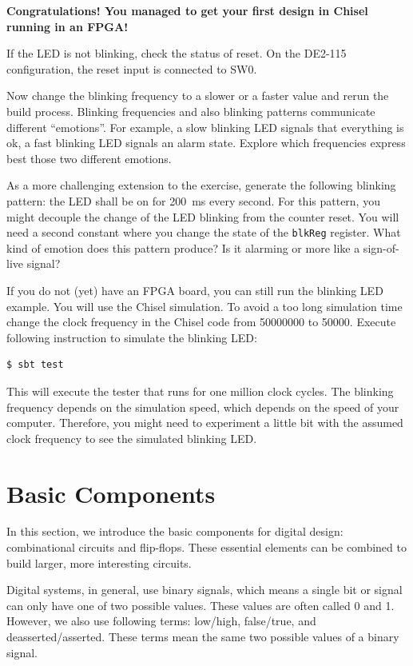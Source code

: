 \documentclass[%
    10pt,
    headinclude, footexclude,
    openright, %
    notitlepage,
    cleardoubleempty,
    headsepline,
    pointlessnumbers,
    bibtotoc, idxtotoc,
    ]{scrbook}
\newcommand{\code}[1]{{\lstinline[basicstyle=\small\ttfamily]{#1}}}
\begin{document}
{\bf Congratulations! You managed to get your first design in Chisel running in an FPGA!}

If the LED is not blinking, check the status of reset. On the DE2-115 configuration,
the reset input is connected to SW0.

Now change the blinking frequency to a slower or a faster value and
rerun the build process. Blinking frequencies and also blinking patterns
communicate different ``emotions''. For example, a slow blinking LED signals that
everything is ok, a fast blinking LED signals an alarm state.
Explore which frequencies express best those two different emotions.

As a more challenging extension to the exercise, generate the following blinking pattern:
the LED shall be on for 200~ms every second. For this pattern, you might
decouple the change of the LED blinking from the counter reset.
You will need a second constant where you change the state of the
\code{blkReg} register. What kind of emotion does this pattern produce?
Is it alarming or more like a sign-of-live signal?

If you do not (yet) have an FPGA board, you can still run the blinking LED example.
You will use  the Chisel simulation. To avoid a too long simulation time change the
clock frequency in the Chisel code from 50000000 to 50000. Execute following
instruction to simulate the blinking LED:

\begin{verbatim}
$ sbt test
\end{verbatim}

This will execute the tester that runs for one million clock cycles.
The blinking frequency depends on the simulation speed, which depends on the
speed of your computer. Therefore, you might need to experiment a little bit
with the assumed clock frequency to see the simulated blinking LED.

\chapter{Basic Components}

In this section, we introduce the basic components for digital design:
combinational circuits and flip-flops.
These essential elements can be combined to build larger, more interesting circuits.

Digital systems, in general, use binary signals, which means a single bit or signal
can only have one of two possible values. These values are often called 0 and 1. However, we
also use following terms: low/high, false/true, and deasserted/asserted.
These terms mean the same two possible values of a binary signal.
\end{document}
